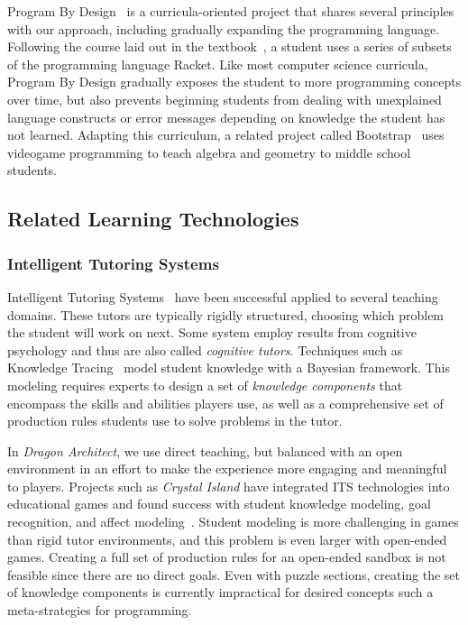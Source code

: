 \documentclass{sig-alternate}
\newcommand{\gametitle}{{\emph{Dragon Architect}}}
\begin{document}
Program By Design~\cite{programbydesign} is a curricula-oriented project that shares several principles with our approach, including gradually expanding the programming language. 
Following the course laid out in the textbook~\cite{felleisen2001design}, a student uses a series of subsets of the programming language Racket.
Like most computer science curricula, Program By Design gradually exposes the student to more programming concepts over time, but also prevents beginning students from dealing with unexplained language constructs or error messages depending on knowledge the student has not learned.
Adapting this curriculum, a related project called Bootstrap~\cite{bootstrap} uses videogame programming to teach algebra and geometry to middle school students.

\subsection{Related Learning Technologies}

\subsubsection{Intelligent Tutoring Systems}
Intelligent Tutoring Systems~\cite{koedinger06cognitive} have been successful applied to several teaching domains.
These tutors are typically rigidly structured, choosing which problem the student will work on next.
Some system employ results from cognitive psychology and thus are also called \emph{cognitive tutors}.
Techniques such as Knowledge Tracing~\cite{corbett1994knowledge} model student knowledge with a Bayesian framework.
This modeling requires experts to design a set of \emph{knowledge components} that encompass the skills and abilities players use, as well as a comprehensive set of production rules students use to solve problems in the tutor.

In \gametitle{}, we use direct teaching, but balanced with an open environment in an effort to make the experience more engaging and meaningful to players.
Projects such as \emph{Crystal Island} have integrated ITS technologies into educational games and found success with student knowledge modeling, goal recognition, and affect modeling~\cite{lester2013serious,rowe2010modeling}.
Student modeling is more challenging in games than rigid tutor environments, and this problem is even larger with open-ended games.
Creating a full set of production rules for an open-ended sandbox is not feasible since there are no direct goals.
Even with puzzle sections, creating the set of knowledge components is currently impractical for desired concepts such a meta-strategies for programming.
\end{document}
